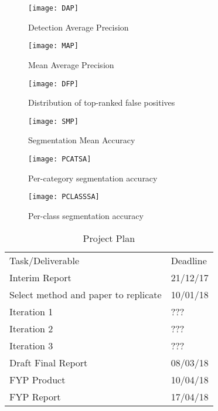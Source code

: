 \begin{figure}
    \texttt{[image: DAP]}
    \caption{Detection Average Precision \textcite{donahue}}
    \label{fig:dap}
\end{figure}

\begin{figure}
    \texttt{[image: MAP]}
    \caption{Mean Average Precision \textcite{donahue}}
    \label{fig:MAP}
\end{figure}

\begin{figure}
    \texttt{[image: DFP]}
    \caption{Distribution of top-ranked false positives
    \textcite{donahue}}
    \label{fig:DFP}
\end{figure}

\begin{figure}
    \texttt{[image: SMP]}
    \caption{Segmentation Mean Accuracy \textcite{donahue}}
    \label{fig:SMP}
\end{figure}

\begin{figure}
    \texttt{[image: PCATSA]}
    \caption{Per-category segmentation accuracy \textcite{donahue}}
    \label{fig:PCATSA}
\end{figure}

\begin{figure}
    \texttt{[image: PCLASSSA]}
    \caption{Per-class segmentation accuracy \textcite{donahue}}
    \label{fig:PCLASSA}
\end{figure}

\begin{table}[]
    \centering
    \caption{Project Plan}
    \label{pp}
    \begin{tabular}{ll}
        Task/Deliverable                     & Deadline \\
        Interim Report                       & 21/12/17 \\
        Select method and paper to replicate & 10/01/18 \\
        Iteration 1                          & ???      \\
        Iteration 2                          & ???      \\
        Iteration 3                          & ???      \\
        Draft Final Report                   & 08/03/18 \\
        FYP Product                          & 10/04/18 \\
        FYP Report                           & 17/04/18
    \end{tabular}
\end{table}
